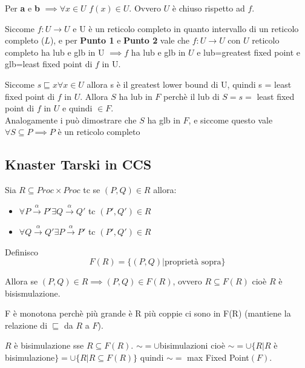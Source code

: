 \documentclass{article}
\newcommand{\passo}{\xrightarrow{\alpha}}
\begin{document}
 Per \textbf{a} e \textbf{b} $\implies \forall x \in U $ $f(x) \in U$. Ovvero $U$ è chiuso rispetto ad $f$.


Siccome $f: U \to U $ e U è un reticolo completo in quanto intervallo di un reticolo completo ($L$), e per \textbf{Punto 1} e \textbf{Punto 2} vale che $f:U \to U$ con $U$ reticolo completo ha lub e glb  in U $\implies f$ ha lub e glb in $U$ e lub=greatest fixed point e glb=least fixed point di $f$ in U.


Siccome $s \sqsubseteq x \forall x \in U$ allora s è il greatest lower bound di U, quindi s = least fixed point di $f$ in $U$. Allora $S$ ha lub in $F$ perchè il lub di $S = s =$ least fixed point di $f$ in $U$ e quindi $\in F$.\\

Analogamente i può dimostrare che $S$ ha glb in $F$, e siccome questo vale $\forall S \subseteq P \implies P$ è un reticolo completo


\subsection{Knaster Tarski in CCS}

Sia $R \subseteq Proc \times Proc$ tc se $(P, Q) \in R$ allora:
\begin{itemize}
    \item $\forall P \passo P' \exists Q \passo Q'$ tc $(P', Q') \in R$
    \item $\forall Q \passo Q' \exists P \passo P'$ tc $(P', Q') \in R$
\end{itemize}

Definisco $$F(R) = \{ (P,Q) | \text{proprietà sopra} \} $$

Allora se $(P,Q) \in R \implies (P,Q) \in F(R)$, ovvero $R \subseteq F(R)$ cioè $R$ è bisismulazione.

F è monotona perchè più grande è R più coppie ci sono in F(R) (mantiene la relazione di $\sqsubseteq$ da $R$ a $F$).

$R$ è bisimulazione sse $R \subseteq F(R)$. $ \sim= \cup$bisimulazioni cioè $\sim = \cup \{ R |R $ è bisimulazione$\} = \cup \{R | R \subseteq F(R)\} $ quindi $\sim = $ max Fixed Point$(F)$.
\end{document}
